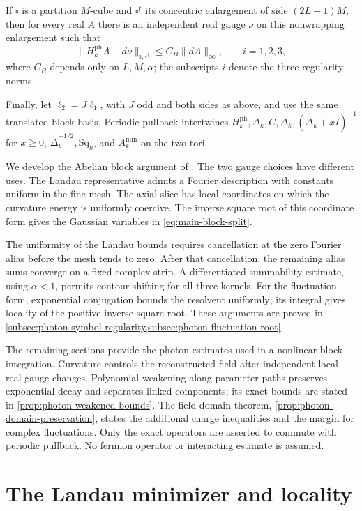 \documentclass[11pt,letterpaper,reqno]{amsart}
\begin{document}
\begin{theorem}
If \(\square\) is a partition \(M\)-cube and
\(\square^\dagger\) its concentric enlargement of side
\((2L+1)M\), then for every real \(A\) there is an independent
real gauge \(\nu\) on this nonwrapping enlargement such that
\[
 \|H_k^{\mathrm{ph}}A-d\nu\|_{i,\square^\dagger}
       \le C_B\|dA\|_\infty,\qquad i=1,2,3,
\]
where \(C_B\) depends only on \(L,M,\alpha\); the subscripts
\(i\) denote the three regularity norms.

Finally, let \(\ell_2=J\ell_1\), with \(J\) odd and both sides
as above, and use the same translated block basis. Periodic
pullback intertwines \(H_k^{\mathrm{ph}},\Delta_k,C,
\widetilde\Delta_k,(\widetilde\Delta_k+xI)^{-1}\) for \(x\ge0\),
\(\widetilde\Delta_k^{-1/2},\mathrm{Sq}_k\), and
\(A_k^{\min}\) on the two tori.
\end{theorem}

We develop the Abelian block argument of
\cite[Section~10]{QED3Manuscript}. The two gauge choices have
different uses. The Landau representative admits a Fourier
description with constants uniform in the fine mesh. The axial
slice has local coordinates on which the curvature energy is
uniformly coercive. The inverse square root of this coordinate
form gives the Gaussian variables in \eqref{eq:main-block-split}.

The uniformity of the Landau bounds requires cancellation at the
zero Fourier alias before the mesh tends to zero. After that
cancellation, the remaining alias sums converge on a fixed complex
strip. A differentiated summability estimate, using \(\alpha<1\),
permits contour shifting for all three kernels. For the
fluctuation form, exponential conjugation bounds the resolvent
uniformly; its integral gives locality of the positive inverse
square root. These arguments are proved in
\cref{subsec:photon-symbol-regularity,subsec:photon-fluctuation-root}.

The remaining sections provide the photon estimates used in a
nonlinear block integration. Curvature controls the reconstructed
field after independent local real gauge changes. Polynomial
weakening along parameter paths preserves exponential decay and
separates linked components; its exact bounds are stated in
\cref{prop:photon-weakened-bounds}. The field-domain theorem,
\cref{prop:photon-domain-preservation}, states the additional
charge inequalities and the margin for complex fluctuations.
Only the exact operators are asserted to commute with periodic
pullback. No fermion operator or interacting estimate is assumed.
\section{The Landau minimizer and locality}\label{sec:photon-primitives}
\end{document}
